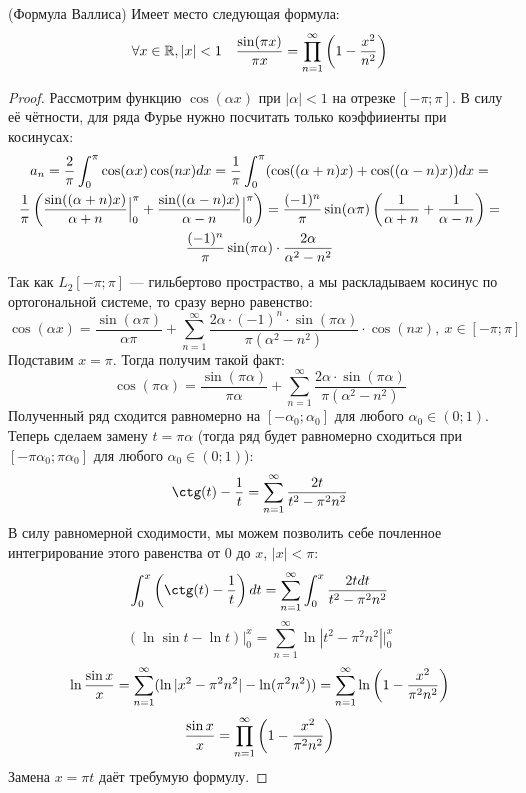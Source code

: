 \begin{theorem} (Формула Валлиса)
	Имеет место следующая формула:
	\[
		\forall x \in \mathbb{R}, |x| < 1 \quad \frac{\sin(\pi x)}{\pi x} = \prod_{n = 1}^\infty \left(1 - \frac{x^2}{n^2}\right)
	\]
\end{theorem}

\begin{proof}
	Рассмотрим функцию $\cos(\alpha x)$ при $|\alpha| < 1$ на отрезке $[-\pi; \pi]$. В силу её чётности, для ряда Фурье нужно посчитать только коэффииенты при косинусах:
	\begin{multline*}
		a_n = \frac{2}{\pi} \int_0^\pi \cos(\alpha x)\cos(nx)dx = \frac{1}{\pi} \int_0^\pi (\cos((\alpha + n)x) + \cos((\alpha - n)x))dx =
		\\
		\frac{1}{\pi}\left(\frac{\sin((\alpha + n)x)}{\alpha + n}\Big|_0^\pi + \frac{\sin((\alpha - n)x)}{\alpha - n}\Big|_0^\pi\right) = \frac{(-1)^n}{\pi} \sin(\alpha \pi) \left(\frac{1}{\alpha + n} + \frac{1}{\alpha - n}\right) =
		\\
		\frac{(-1)^n}{\pi} \sin(\pi\alpha) \cdot \frac{2\alpha}{\alpha^2 - n^2}
	\end{multline*}
	Так как $L_2[-\pi; \pi]$ --- гильбертово простраство, а мы раскладываем косинус по ортогональной системе, то сразу верно равенство:
	\[
		\cos(\alpha x) = \frac{\sin(\alpha \pi)}{\alpha \pi} + \sum_{n = 1}^\infty \frac{2\alpha \cdot (-1)^n \cdot \sin(\pi\alpha)}{\pi(\alpha^2 - n^2)} \cdot \cos(nx),\ x \in [-\pi; \pi]
	\]
	Подставим $x = \pi$. Тогда получим такой факт:
	\[
		\cos(\pi\alpha) = \frac{\sin(\pi\alpha)}{\pi\alpha} + \sum_{n = 1}^\infty \frac{2\alpha \cdot \sin(\pi\alpha)}{\pi(\alpha^2 - n^2)}
	\]
	Полученный ряд сходится равномерно на $[-\alpha_0; \alpha_0]$ для любого $\alpha_0 \in (0; 1)$. Теперь сделаем замену $t = \pi\alpha$ (тогда ряд будет равномерно сходиться при $[-\pi\alpha_0; \pi\alpha_0]$ для любого $\alpha_0 \in (0; 1)$):
	\[
		\ctg(t) - \frac{1}{t} = \sum_{n = 1}^\infty \frac{2t}{t^2 - \pi^2n^2}
	\]
	В силу равномерной сходимости, мы можем позволить себе почленное интегрирование этого равенства от 0 до $x$, $|x| < \pi$:
	\[
		\int_0^x \ps{\ctg(t) - \frac{1}{t}}dt = \sum_{n = 1}^\infty \int_0^x \frac{2tdt}{t^2 - \pi^2n^2}
	\]\[
		(\ln \sin t - \ln t)\Big|_0^x  = \sum_{n = 1}^\infty \ln |t^2 - \pi^2n^2|\Big|_0^x
	\]\[
		\ln \frac{\sin x}{x} = \sum_{n = 1}^\infty (\ln|x^2 - \pi^2n^2| - \ln(\pi^2n^2)) = \sum_{n = 1}^\infty \ln\left(1 - \frac{x^2}{\pi^2n^2}\right)
	\]\[
		\frac{\sin x}{x} = \prod_{n = 1}^\infty \left(1 - \frac{x^2}{\pi^2n^2}\right)
	\]
	Замена $x = \pi t$ даёт требумую формулу.
\end{proof}

